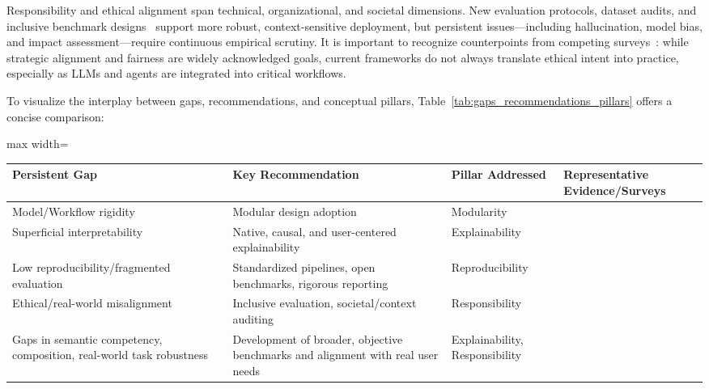 \documentclass[sigconf]{acmart}
\begin{document}
Responsibility and ethical alignment span technical, organizational, and societal dimensions. New evaluation protocols, dataset audits, and inclusive benchmark designs~\cite{ref93,ref94,ref96,ref98,ref104,ref107,ref108} support more robust, context-sensitive deployment, but persistent issues---including hallucination, model bias, and impact assessment---require continuous empirical scrutiny. It is important to recognize counterpoints from competing surveys~\cite{ref55,ref94,ref96}: while strategic alignment and fairness are widely acknowledged goals, current frameworks do not always translate ethical intent into practice, especially as LLMs and agents are integrated into critical workflows.

To visualize the interplay between gaps, recommendations, and conceptual pillars, Table~\ref{tab:gaps_recommendations_pillars} offers a concise comparison:

\begin{table*}[htbp]
\centering
\caption{Summary of Persistent Gaps, Key Recommendations, and Foundational Pillars in Foundation Model Research}
\label{tab:gaps_recommendations_pillars}
\begin{adjustbox}{max width=\textwidth}
\begin{tabular}{@{}llll@{}}
\toprule
\textbf{Persistent Gap} & \textbf{Key Recommendation} & \textbf{Pillar Addressed} & \textbf{Representative Evidence/Surveys} \\
\midrule
Model/Workflow rigidity & Modular design adoption & Modularity & \cite{ref78,ref86,ref87,ref98,ref100,ref101,ref102} \\
Superficial interpretability & Native, causal, and user-centered explainability & Explainability & \cite{ref9,ref31,ref36,ref49,ref50,ref51,ref55,ref83,ref93} \\
Low reproducibility/fragmented evaluation & Standardized pipelines, open benchmarks, rigorous reporting & Reproducibility & \cite{ref81,ref83,ref91,ref92,ref95,ref97,ref99,ref106,ref107,ref108} \\
Ethical/real-world misalignment & Inclusive evaluation, societal/context auditing & Responsibility & \cite{ref93,ref94,ref96,ref98,ref104,ref107,ref108} \\
Gaps in semantic competency, composition, real-world task robustness & Development of broader, objective benchmarks and alignment with real user needs & Explainability, Responsibility & \cite{ref55,ref94,ref96,ref105} \\
\bottomrule
\end{tabular}
\end{adjustbox}
\end{table*}
\end{document}
